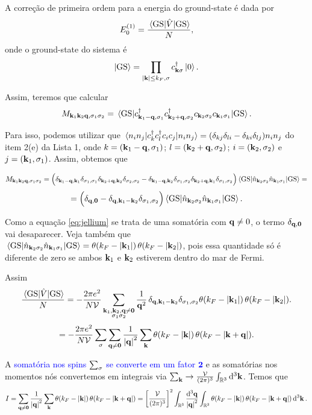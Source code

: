\documentclass[a4paper,10pt]{article}
\begin{document}
A correção de primeira ordem para a energia do ground-state é dada por
$$
E_0^{(1)} = \frac{\ev{\hat{V}}{\text{GS}}}{N},
$$
onde o ground-state do sistema é
$$
\ket{\text{GS}} = \prod_{\abs{\vb{k}} \leq k_{F}, \sigma} c_{\vb{k} \sigma}^{\dagger} \ket{0}.
$$

Assim, teremos que calcular
$$
M_{\k_1 \k_2 \q, \s_1 \s_2} = \ev{c_{\k_1 - \q, \s_1}^\d c_{\k_2 + \q, \s_2}^\d c_{\k_2 \s_2} c_{\k_1 \s_1}}{\text{GS}}.
$$

Para isso, podemos utilizar que $\ev{c_k^\d c_l^\d c_i c_j}{n_i n_j} = (\delta_{kj} \delta_{li} - \delta_{ki} \delta_{lj}) n_i n_j$ do item 2(e) da Lista 1, onde $k = (\vb{k}_1 - \vb{q}, \sigma_1)$; $l = (\vb{k}_2 + \vb{q}, \sigma_2)$; $i = (\vb{k}_2, \sigma_2)$ e $j = (\vb{k}_1, \sigma_1)$. Assim, obtemos que

$$
M_{\k_1 \k_2 \q, \s_1 \s_2} =
\Big(
\delta_{\k_1 - \q, \k_1} \delta_{\s_1, \s_1} \delta_{\k_2 + \q, \k_2} \delta_{\s_2, \s_2} -
\delta_{\k_1 - \q, \k_2} \delta_{\s_1, \s_2} \delta_{\k_2 + \q, \k_1} \delta_{\s_1, \s_2}
\Big) \ev{\nn_{\k_2 \s_2} \nn_{\k_1 \s_1}}{\text{GS}} =
$$
$$
=
\Big(
\delta_{\q, \0} -
\delta_{\q, \k_1 - \k_2} \delta_{\s_1, \s_2}
\Big) \ev{\nn_{\k_2 \s_2} \nn_{\k_1 \s_1}}{\text{GS}}.
$$

Como a equação \ref{eq:jellium} se trata de uma somatória com $\vb{q} \neq 0$, o termo $\delta_{\vb{q}, \vb{0}}$ vai desaparecer. Veja também que $\ev{\nn_{\k_2 \s_2} \nn_{\k_1 \s_1}}{\text{GS}} = \theta(k_F - \abs{\k_1}) \, \theta(k_F - \abs{\k_2})$, pois essa quantidade só é diferente de zero se ambos $\vb{k}_1$ e $\vb{k}_2$ estiverem dentro do mar de Fermi.

Assim
$$
\frac{\ev{\hat{V}}{\text{GS}}}{N} =
- \frac{2 \pi e^2}{N \mathcal{V}} \sum_{\substack{\k_1, \k_2, \q \neq \0 \\ \s_1 \s_2}}
\frac{1}{\q^2} \,
\delta_{\q, \k_1 - \k_2} \delta_{\s_1, \s_2} \theta(k_F - \abs{\k_1}) \, \theta(k_F - \abs{\k_2}).
$$
$$
= - \frac{2 \pi e^2}{N \mathcal{V}} \sum_{\sigma} \sum_{\vb{q} \neq \vb{0}} \frac{1}{\abs{\vb{q}}^2} \sum_{\vb{k}}
\theta(k_F - \abs{\vb{k}}) \, \theta(k_F - \abs{\vb{k} + \vb{q}}).
$$

A \textcolor{blue}{somatória nos spins $\sum_{\sigma}$ se converte em um fator $\bm{2}$} e as somatórias nos momentos nós convertemos em integrais via $\sum_{\vb{k}} \to \frac{\mathcal{V}}{(2\pi)^3} \int_{\mathbb{R}^3} \dd[3]{\vb{k}}$. Temos que
$$
I = \sum_{\vb{q} \neq \vb{0}} \frac{1}{\abs{\vb{q}}^2} \sum_{\vb{k}}
\theta(k_F - \abs{\vb{k}}) \, \theta(k_F - \abs{\vb{k} + \vb{q}}) =
\qty[ \frac{\mathcal{V}}{(2\pi)^3} ]^2 \int_{\mathbb{R}^3} \frac{\dd[3]{\vb{q}}}{\abs{\vb{q}}^2} \int_{\mathbb{R}^3}
\theta(k_F - \abs{\vb{k}}) \, \theta(k_F - \abs{\vb{k} + \vb{q}}) \dd[3]{\vb{k}}.
$$
\end{document}
